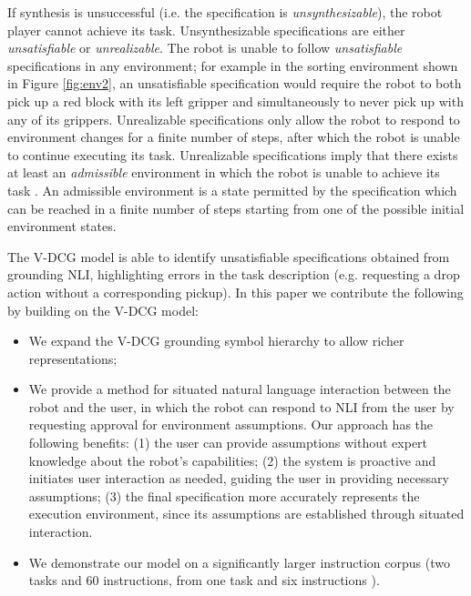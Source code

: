 \documentclass[letterpaper]{article} %
\begin{document}
If synthesis is unsuccessful (i.e. the specification is \textit{unsynthesizable}), the robot player cannot achieve its task. Unsynthesizable specifications are either \textit{unsatisfiable} or \textit{unrealizable}.
The robot is unable to follow \textit{unsatisfiable} specifications in any environment; for example in the sorting environment shown in Figure \ref{fig:env2}, an unsatisfiable specification would require the robot to both pick up a red block with its left gripper and simultaneously to never pick up with any of its grippers. Unrealizable specifications only allow the robot to respond to environment changes for a finite number of steps, after which the robot is unable to continue executing its task. Unrealizable specifications imply that there exists at least an \textit{admissible} environment in which the robot is unable to achieve its task \cite{raman2013explaining}. An admissible environment is a state permitted by the specification which can be reached in a finite number of steps starting from one of the possible initial environment states.

The V-DCG model is able to identify unsatisfiable specifications obtained from grounding NLI, highlighting errors in the task description (e.g. requesting a drop action without a corresponding pickup).
In this paper we contribute the following by building on the V-DCG model:
\begin{itemize}[nolistsep,noitemsep]
\item We expand the V-DCG grounding symbol hierarchy to allow richer representations;

\item We provide a method for situated natural language interaction between the robot and the user, in which the robot can respond to NLI from the user by requesting approval for environment assumptions. Our approach has the following benefits: (1) the user can provide assumptions without expert knowledge about the robot's capabilities; (2) the system is proactive and initiates user interaction as needed, guiding the user in providing necessary assumptions; (3) the final specification more accurately represents the execution environment, since its assumptions are established through situated interaction.

\item We demonstrate our model on a significantly larger instruction corpus (two tasks and 60 instructions, from one task and six instructions \cite{boteanu2016model}).

\end{itemize}
\end{document}

